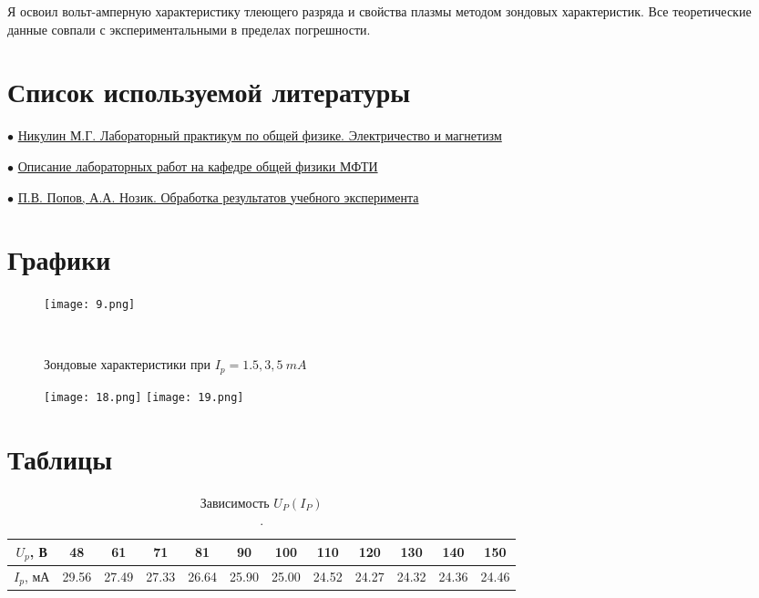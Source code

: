 Я освоил вольт-амперную характеристику тлеющего раз­ряда и свойства плазмы методом зондовых характеристик. Все теоретические данные совпали с экспериментальными в пределах погрешности.


\section{{Список используемой литературы}}

$\bullet$ \href{https://vk.com/doc-139677307_612194888}{Никулин М.Г. Лабораторный практикум по общей физике. Электричество и магнетизм}

$\bullet$ \href{https://mipt.ru/education/chair/physics/S_III/lab_el.php}{Описание лабораторных работ на кафедре общей физики МФТИ}

$\bullet$ \href{https://vk.com/doc-139677307_612194961}{П.В. Попов, А.А. Нозик. Обработка результатов учебного эксперимента}


\newpage
\section{{Графики}}

\begin{figure}[h]
    \centering
    \texttt{[image: 9.png]}
	\caption{}
\end{figure}

\begin{figure}[!]
    \centering
    \\
    	\caption{Зондовые характеристики при $I_p = 1.5, 3, 5\ mA$}
\end{figure}

\begin{figure}[!]
    \centering
    \texttt{[image: 18.png]}
    \texttt{[image: 19.png]}
	\caption{}
\end{figure}

\newpage
\section{Таблицы}

\begin{table}[h]
\centering
\begin{tabular}{|c|c|c|c|c|c|c|c|c|c|c|c|}
\hline
$U_p$, В & 48 & 61 & 71 & 81 & 90 & 100 & 110 & 120 & 130 & 140 & 150 \\ \hline
$I_p$, мА & 29.56 & 27.49 & 27.33 & 26.64 & 25.90 & 25.00 & 24.52 & 24.27 & 24.32 & 24.36 & 24.46  \\ \hline
\end{tabular}
\caption{Зависимость $U_P(I_P)$ \\.}
\end{table} 


